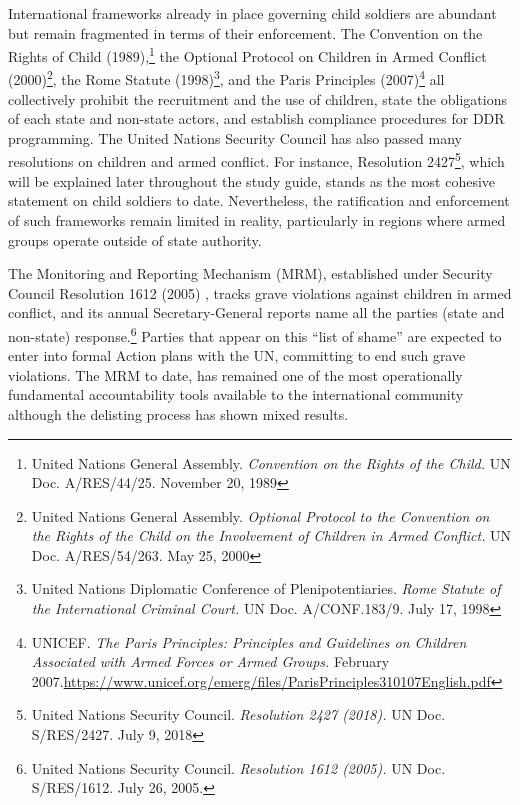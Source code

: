 International frameworks already in place governing child soldiers are abundant but remain fragmented in terms of their enforcement. The Convention on the Rights of Child (1989),\footnote{United Nations General Assembly. \emph{Convention on the Rights of the Child.} UN Doc. A/RES/44/25. November 20, 1989} the Optional Protocol on Children in Armed Conflict (2000)\footnote{United Nations General Assembly. \emph{Optional Protocol to the Convention on the Rights of the Child on the Involvement of Children in Armed Conflict.} UN Doc. A/RES/54/263. May 25, 2000}, the Rome Statute (1998)\footnote{United Nations Diplomatic Conference of Plenipotentiaries. \emph{Rome Statute of the International Criminal Court.} UN Doc. A/CONF.183/9. July 17, 1998}, and the Paris Principles (2007)\footnote{UNICEF. \emph{The Paris Principles: Principles and Guidelines on Children Associated with Armed Forces or Armed Groups.} February 2007.\url{https://www.unicef.org/emerg/files/ParisPrinciples310107English.pdf}} all collectively prohibit the recruitment and the use of children, state the obligations of each state and non-state actors, and establish compliance procedures for DDR programming. The United Nations Security Council has also passed many resolutions on children and armed conflict. For instance, Resolution 2427\footnote{United Nations Security Council. \emph{Resolution 2427 (2018).} UN Doc. S/RES/2427. July 9, 2018}, which will be explained later throughout the study guide, stands as the most cohesive statement on child soldiers to date. Nevertheless, the ratification and enforcement of such frameworks remain limited in reality, particularly in regions where armed groups operate outside of state authority.

The Monitoring and Reporting Mechanism (MRM), established under Security Council Resolution 1612 (2005) , tracks grave violations against children in armed conflict, and its annual Secretary-General reports name all the parties (state and non-state) response.\footnote{United Nations Security Council. \emph{Resolution 1612 (2005).} UN Doc. S/RES/1612. July 26, 2005.} Parties that appear on this “list of shame” are expected to enter into formal Action plans with the UN, committing to end such grave violations. The MRM to date, has remained one of the most operationally fundamental accountability tools available to the international community although the delisting process has shown mixed results.

